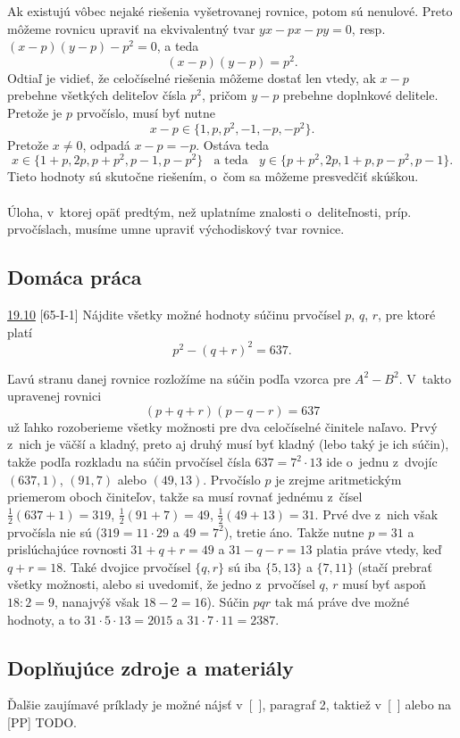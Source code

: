 \rieh Ak existujú vôbec nejaké riešenia vyšetrovanej rovnice, potom sú nenulové. Preto môžeme rovnicu upraviť na ekvivalentný tvar $yx-px-py=0$, resp. $(x-p)(y-p)-p^2=0$, a teda $$(x-p)(y-p)=p^2.$$ Odtiaľ je vidieť, že celočíselné riešenia môžeme dostať len vtedy, ak $x-p$ prebehne všetkých deliteľov čísla $p^2$, pričom $y-p$ prebehne doplnkové delitele. Pretože je $p$ prvočíslo, musí byť nutne $$x-p \in \{1, p, p^2, -1, -p, -p^2\}.$$ Pretože $x\neq 0$, odpadá $x-p=-p$. Ostáva teda $$x \in \{1+p, 2p, p+p^2, p-1, p-p^2\} \ \ \ \ \text{a teda} \ \ \ \ y \in \{p+p^2, 2p, 1+p, p-p^2, p-1\}.$$ Tieto hodnoty sú skutočne riešením, o~čom sa môžeme presvedčiť skúškou.\\
\\
\kom Úloha, v~ktorej opäť predtým, než uplatníme znalosti o~deliteľnosti, príp. prvočíslach, musíme umne upraviť východiskový tvar rovnice.


\subsection*{Domáca práca}

\begin{tcolorbox}[breakable,notitle,boxrule=0pt,colback=light-gray,colframe=light-gray]\ul{19.10} [65-I-1]
Nájdite všetky možné hodnoty súčinu prvočísel $p$, $q$, $r$, pre ktoré platí
$$p^2 - (q + r)^2= 637.$$

\end{tcolorbox}

\rieh Ľavú stranu danej rovnice rozložíme na súčin podľa vzorca pre $A^2 - B^2$. V~takto upravenej rovnici
$$(p + q + r)(p - q - r) = 637$$
už ľahko rozoberieme všetky možnosti pre dva celočíselné činitele naľavo. Prvý z~nich je väčší a kladný, preto aj druhý musí byť kladný (lebo taký je ich súčin), takže podľa rozkladu na súčin prvočísel čísla $637 = 7^2 \cdot 13$ ide o~jednu z~dvojíc $(637, 1)$, $(91, 7)$
alebo $(49, 13)$. Prvočíslo $p$ je zrejme aritmetickým priemerom oboch činiteľov, takže sa musí rovnať jednému z~čísel $\frac{1}{2}(637 + 1) = 319$, $\frac{1}{2}(91 + 7) = 49$, $\frac{1}{2}(49 + 13) = 31$. Prvé dve z~nich však prvočísla nie sú ($319 = 11 \cdot  29$ a $49 = 7^2$), tretie áno. Takže nutne $p = 31$ a prislúchajúce rovnosti $31 + q + r = 49$ a $31 - q - r = 13$ platia práve vtedy, keď $q + r = 18$. Také dvojice prvočísel $\{q, r\}$ sú iba $\{5, 13\}$ a $\{7, 11\}$ (stačí prebrať
všetky možnosti, alebo si uvedomiť, že jedno z~prvočísel $q$, $r$ musí byť aspoň $18 : 2 = 9$, nanajvýš však $18 - 2 = 16$). Súčin $pqr$ tak má práve dve možné hodnoty, a to $31 \cdot  5\cdot  13 = 2 015$ a $31 \cdot  7 \cdot  11 = 2 387$.\\

\subsection*{Doplňujúce zdroje a materiály}
Ďalšie zaujímavé príklady je možné nájsť v~[~\cite{herman2011}], paragraf 2, taktiež v~[~\cite{holton2010}] alebo na [PP] TODO.